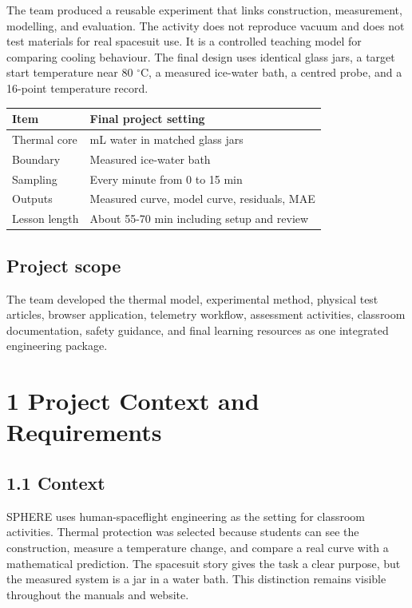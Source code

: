 \documentclass[10pt,conference,a4paper]{IEEEtran}
\begin{document}
The team produced a reusable experiment that links construction, measurement, modelling, and evaluation. The activity does not reproduce vacuum and does not test materials for real spacesuit use. It is a controlled teaching model for comparing cooling behaviour. The final design uses identical glass jars, a target start temperature near 80 $^\circ$C, a measured ice-water bath, a centred probe, and a 16-point temperature record.

\begin{center}\footnotesize
\setlength{\tabcolsep}{2.5pt}
\renewcommand{\arraystretch}{1.14}
\begin{tabular}{>{\raggedright\arraybackslash}p{}>{\raggedright\arraybackslash}p{}}
\toprule
\textbf{Item} & \textbf{Final project setting} \\
\midrule
Thermal core & 100 mL water in matched glass jars \\
Boundary & Measured ice-water bath \\
Sampling & Every minute from 0 to 15 min \\
Outputs & Measured curve, model curve, residuals, MAE \\
Lesson length & About 55-70 min including setup and review \\
\bottomrule
\end{tabular}
\end{center}

\subsection*{Project scope}

The team developed the thermal model, experimental method, physical test articles, browser application, telemetry workflow, assessment activities, classroom documentation, safety guidance, and final learning resources as one integrated engineering package.

\section*{1 Project Context and Requirements}

\subsection*{1.1 Context}

SPHERE uses human-spaceflight engineering as the setting for classroom activities. Thermal protection was selected because students can see the construction, measure a temperature change, and compare a real curve with a mathematical prediction. The spacesuit story gives the task a clear purpose, but the measured system is a jar in a water bath. This distinction remains visible throughout the manuals and website.
\end{document}
